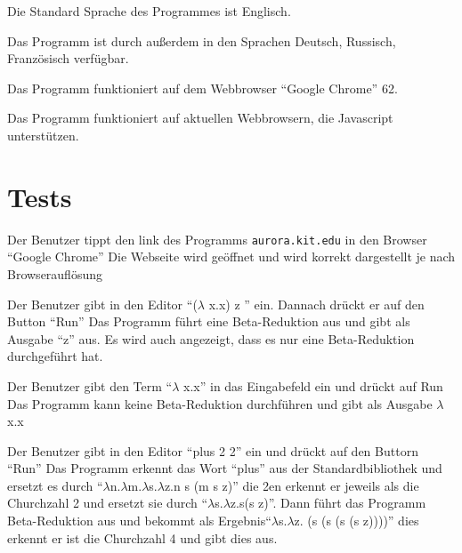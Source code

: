 \documentclass[parskip=full,11pt,twoside]{scrartcl}
\begin{document}
Die Standard Sprache des Programmes ist Englisch.

Das Programm ist durch außerdem in den Sprachen Deutsch, Russisch, Französisch verfügbar.


Das Programm funktioniert auf dem Webbrowser \enquote{Google Chrome} 62.

Das Programm funktioniert auf aktuellen Webbrowsern, die Javascript unterstützen.


\section{Tests}


{Der Benutzer tippt den link des Programms \texttt{aurora.kit.edu} in den Browser \enquote {Google Chrome} }
{ Die Webseite wird geöffnet und wird korrekt dargestellt je nach Browserauflösung}

{ Der Benutzer gibt in den Editor \enquote {($\lambda$ x.x) z } ein. Dannach drückt er auf den Button \enquote {Run}}
{ Das Programm führt eine Beta-Reduktion aus und gibt als Ausgabe \enquote {z} aus. Es wird auch angezeigt, dass es nur eine Beta-Reduktion durchgeführt hat.}

{Der Benutzer gibt den Term \enquote {$\lambda$ x.x} in das Eingabefeld ein und drückt auf Run}
{Das Programm kann keine Beta-Reduktion durchführen und gibt als Ausgabe $\lambda$ x.x}

{Der Benutzer gibt in den Editor \enquote {plus 2 2} ein und drückt auf den Buttorn \enquote {Run}}
{ Das Programm erkennt das Wort \enquote {plus} aus der Standardbibliothek und ersetzt es durch \enquote {$\lambda$n.$\lambda$m.$\lambda$s.$\lambda$z.n s (m s z)} die 2en erkennt er jeweils als die Churchzahl 2 und ersetzt sie durch \enquote {$\lambda$s.$\lambda$z.s(s z)}. Dann führt das Programm Beta-Reduktion aus und bekommt als Ergebnis\enquote {$\lambda$s.$\lambda$z. (s (s (s (s z))))} dies erkennt er ist die Churchzahl 4 und gibt dies aus. }
\end{document}
